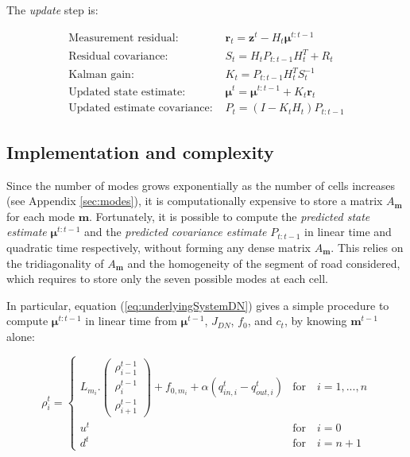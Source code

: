\documentclass[11pt]{article}
\numberwithin{equation}{section}
\numberwithin{figure}{section}
\numberwithin{table}{section}
\begin{document}
\noindent The \textit{update} step is:

\begin{equation}
\begin{array}{ll}
\text{Measurement residual: } & \boldsymbol r_{t} = \boldsymbol z^{t} - H_{t}\boldsymbol\mu^{t:t-1}\\
\text{Residual covariance: } & S_{t} = H_{t}P_{t:t-1}H_{t}^{T}+R_{t}\\
\text{Kalman gain: } & K_{t} = P_{t:t-1}H_{t}^{T}S_{t}^{-1}\\
\text{Updated state estimate: } & \boldsymbol\mu^{t} = \boldsymbol\mu^{t:t-1} + K_{t} \boldsymbol r_{t}\\
\text{Updated estimate covariance: } & P_{t} = (I - K_{t}H_{t})P_{t:t-1}
\end{array}
\label{eq:update}
\end{equation}

\subsection{Implementation and complexity}

Since the number of modes grows exponentially as the number of cells increases (see Appendix \ref{sec:modes}), it is computationally expensive to store a matrix $A_{\boldsymbol m}$ for each mode $\boldsymbol m$. Fortunately, it is possible to compute the \textit{predicted state estimate} $\boldsymbol\mu^{t:t-1}$ and the \textit{predicted covariance estimate} $P_{t:t-1}$ in linear time and quadratic time respectively, without forming any dense matrix $A_{\boldsymbol m}$. This relies on the tridiagonality of $A_{\boldsymbol m}$ and the homogeneity of the segment of road considered, which requires to store only the seven possible modes at each cell\footnotemark.


In particular, equation (\ref{eq:underlyingSystemDN}) gives a simple procedure to compute $\boldsymbol\mu^{t:t-1}$ in linear time from $\boldsymbol\mu^{t-1}$, $J_{DN}$, $f_{0}$, and $c_{t}$, by knowing $\boldsymbol m^{t-1}$ alone:

\begin{equation}
\rho^{t}_{i} = \begin{cases}
L_{m_{i}}.\left( \begin{array}{c}
\rho^{t-1}_{i-1}\\
\rho^{t-1}_{i}\\
\rho^{t-1}_{i+1}
\end{array} \right)
+ f_{0,m_{i}} + \alpha(q^{t}_{in,i}-q^{t}_{out,i}) & \text{for}\quad i=1,...,n\\
u^{t} & \text{for}\quad i=0\\
d^{t} & \text{for}\quad i=n+1
\end{cases}
\label{eq:underlyingSystemDNcopy}
\end{equation}
\end{document}
